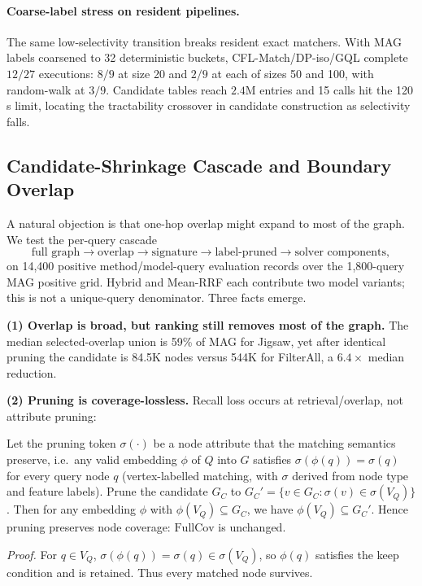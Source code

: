\documentclass[runningheads]{llncs}
\begin{document}
\paragraph{Coarse-label stress on resident pipelines.} The same low-selectivity transition breaks resident exact matchers. With MAG labels coarsened to 32 deterministic buckets, CFL-Match/DP-iso/GQL complete $12/27$ executions: $8/9$ at size 20 and $2/9$ at each of sizes 50 and 100, with random-walk at $3/9$. Candidate tables reach $2.4$M entries and 15 calls hit the 120\,s limit, locating the tractability crossover in candidate construction as selectivity falls.

\subsection{Candidate-Shrinkage Cascade and Boundary Overlap}
\label{sec:shrinkage}

A natural objection is that one-hop overlap might expand to most of the graph. We test the per-query cascade
\[
\text{full graph} \to \text{overlap} \to \text{signature} \to \text{label-pruned} \to \text{solver components},
\]
on 14{,}400 positive method/model-query evaluation records over the 1{,}800-query MAG positive grid. Hybrid and Mean-RRF each contribute two model variants; this is not a unique-query denominator. Three facts emerge.

\textbf{(1) Overlap is broad, but ranking still removes most of the graph.} The median selected-overlap union is 59\% of MAG for Jigsaw, yet after identical pruning the candidate is 84.5K nodes versus 544K for FilterAll, a $6.4\times$ median reduction.

\textbf{(2) Pruning is coverage-lossless.} Recall loss occurs at retrieval/overlap, not attribute pruning:

\begin{proposition}
\label{prop:lossless}
Let the pruning token $\sigma(\cdot)$ be a node attribute that the matching semantics preserve, i.e.\ any valid embedding $\phi$ of $Q$ into $G$ satisfies $\sigma(\phi(q))=\sigma(q)$ for every query node $q$ (vertex-labelled matching, with $\sigma$ derived from node type and feature labels). Prune the candidate $G_C$ to $G_C'=\{v\in G_C : \sigma(v)\in \sigma(V_Q)\}$. Then for any embedding $\phi$ with $\phi(V_Q)\subseteq G_C$, we have $\phi(V_Q)\subseteq G_C'$. Hence pruning preserves node coverage: $\mathrm{FullCov}$ is unchanged.
\end{proposition}
\emph{Proof.} For $q\in V_Q$, $\sigma(\phi(q))=\sigma(q)\in\sigma(V_Q)$, so $\phi(q)$ satisfies the keep condition and is retained. Thus every matched node survives.
\end{document}
